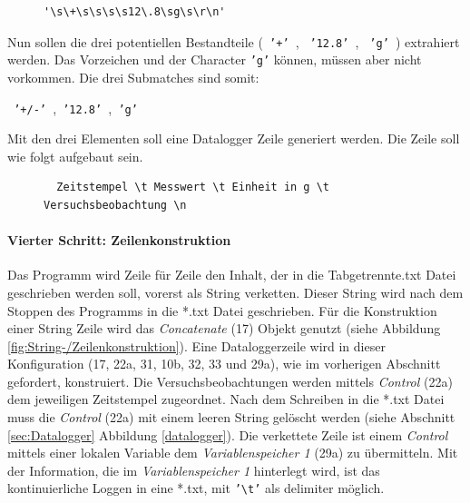 \begin{figure}[h!] %
\centering
\begin{varwidth}{\linewidth}
\begin{verbatim}
'\s\+\s\s\s\s12\.8\sg\s\r\n'
\end{verbatim}
\end{varwidth}
\end{figure}


\noindent Nun sollen die drei potentiellen Bestandteile (\texttt{ '+' }, \texttt{ '12.8' }, \texttt{ 'g' }) extrahiert werden. Das Vorzeichen und der Character \texttt{'g'} können, müssen aber nicht vorkommen. Die drei Submatches sind somit: 
\vspace{-2pt}
\begin{center}  \texttt{ '+/-' },\texttt{ '12.8' },\texttt{ 'g' } \end{center}

\noindent Mit den drei Elementen soll eine Datalogger Zeile generiert werden. Die Zeile soll wie folgt aufgebaut sein.

\begin{figure}[h!] %
\begin{center}
\begin{varwidth}{\linewidth}
\begin{verbatim}
  Zeitstempel \t Messwert \t Einheit in g \t Versuchsbeobachtung \n
\end{verbatim}
\end{varwidth}
\end{center}
\end{figure}

\paragraph{Vierter Schritt: Zeilenkonstruktion} Das Programm wird Zeile für Zeile den Inhalt, der in die Tabgetrennte.txt Datei geschrieben werden soll, vorerst als String verketten. Dieser String wird nach dem Stoppen des Programms in die *.txt Datei geschrieben. Für die Konstruktion einer String Zeile wird das \textit{Concatenate} (17) Objekt genutzt (siehe Abbildung \ref{fig:String-/Zeilenkonstruktion}). Eine Dataloggerzeile wird in dieser Konfiguration (17, 22a, 31, 10b, 32, 33 und 29a), wie im vorherigen Abschnitt gefordert, konstruiert. Die Versuchsbeobachtungen werden mittels \textit{Control} (22a) dem jeweiligen Zeitstempel zugeordnet. Nach dem Schreiben in die *.txt Datei muss die \textit{Control} (22a) mit einem leeren String gelöscht werden (siehe Abschnitt \ref{sec:Datalogger} Abbildung \ref{datalogger}). Die verkettete Zeile ist einem \textit{Control} mittels einer lokalen Variable dem \textit{Variablenspeicher 1} (29a) zu übermitteln. Mit der Information, die im \textit{Variablenspeicher 1} hinterlegt wird, ist das kontinuierliche Loggen in eine *.txt, mit \texttt{'\textbackslash t'} als delimiter möglich.

